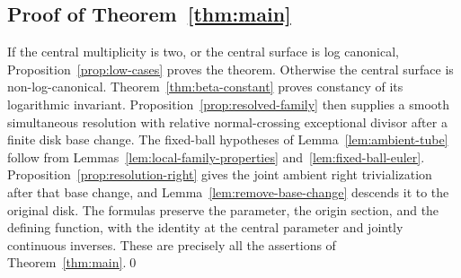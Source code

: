 \subsection{Proof of Theorem~\ref{thm:main}}
If the central multiplicity is two, or the central surface is log canonical,
Proposition~\ref{prop:low-cases} proves the theorem.  Otherwise the central
surface is non-log-canonical.  Theorem~\ref{thm:beta-constant} proves
constancy of its logarithmic invariant.  Proposition~\ref{prop:resolved-family}
then supplies a smooth simultaneous resolution with relative normal-crossing
exceptional divisor after a finite disk base change.  The fixed-ball
hypotheses of Lemma~\ref{lem:ambient-tube} follow from
Lemmas~\ref{lem:local-family-properties} and~\ref{lem:fixed-ball-euler}.
Proposition~\ref{prop:resolution-right} gives the joint ambient right
trivialization after that base change, and Lemma~\ref{lem:remove-base-change}
descends it to the original disk.  The formulas preserve the parameter,
the origin section, and the defining function, with the identity at the
central parameter and jointly continuous inverses.  These are precisely
all the assertions of Theorem~\ref{thm:main}.\qed

